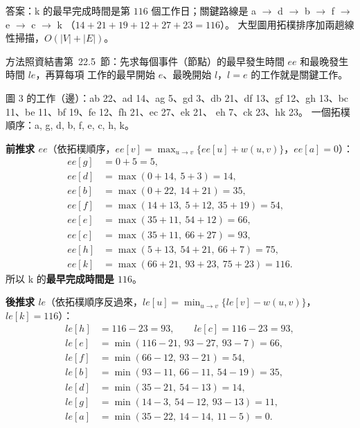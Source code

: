 \begin{pastsoln}
答案：k 的最早完成時間是第 $116$ 個工作日；關鍵路線是 a $\to$ d $\to$ b $\to$ f $\to$ e $\to$ c $\to$ k
（$14 + 21 + 19 + 12 + 27 + 23 = 116$）。 大型圖用拓樸排序加兩趟線性掃描，$O(|V| + |E|)$。

方法照資結書第~22.5~節：先求每個事件（節點）的最早發生時間 $\mathit{ee}$ 和最晚發生時間 $\mathit{le}$，再算每項
工作的最早開始 $e$、最晚開始 $l$，$l = e$ 的工作就是關鍵工作。

圖 3 的工作（邊）：ab 22、ad 14、ag 5、gd 3、db 21、df 13、gf 12、gh 13、bc 11、be 11、bf 19、fe 12、fh 21、ec 27、ek 21、
eh 7、ck 23、hk 23。 一個拓樸順序：a, g, d, b, f, e, c, h, k。

\textbf{前推求 $\mathit{ee}$}（依拓樸順序，$\mathit{ee}[v] = \max_{u \to v}\{\mathit{ee}[u] + w(u,v)\}$，$\mathit{ee}[a] = 0$）：
\begin{align*}
\mathit{ee}[g] &= 0 + 5 = 5, \\
\mathit{ee}[d] &= \max(0 + 14,\ 5 + 3) = 14, \\
\mathit{ee}[b] &= \max(0 + 22,\ 14 + 21) = 35, \\
\mathit{ee}[f] &= \max(14 + 13,\ 5 + 12,\ 35 + 19) = 54, \\
\mathit{ee}[e] &= \max(35 + 11,\ 54 + 12) = 66, \\
\mathit{ee}[c] &= \max(35 + 11,\ 66 + 27) = 93, \\
\mathit{ee}[h] &= \max(5 + 13,\ 54 + 21,\ 66 + 7) = 75, \\
\mathit{ee}[k] &= \max(66 + 21,\ 93 + 23,\ 75 + 23) = 116.
\end{align*}
所以 k 的\textbf{最早完成時間是 $116$}。

\textbf{後推求 $\mathit{le}$}（依拓樸順序反過來，$\mathit{le}[u] = \min_{u \to v}\{\mathit{le}[v] - w(u,v)\}$，
$\mathit{le}[k] = 116$）：
\begin{align*}
\mathit{le}[h] &= 116 - 23 = 93, \qquad \mathit{le}[c] = 116 - 23 = 93, \\
\mathit{le}[e] &= \min(116 - 21,\ 93 - 27,\ 93 - 7) = 66, \\
\mathit{le}[f] &= \min(66 - 12,\ 93 - 21) = 54, \\
\mathit{le}[b] &= \min(93 - 11,\ 66 - 11,\ 54 - 19) = 35, \\
\mathit{le}[d] &= \min(35 - 21,\ 54 - 13) = 14, \\
\mathit{le}[g] &= \min(14 - 3,\ 54 - 12,\ 93 - 13) = 11, \\
\mathit{le}[a] &= \min(35 - 22,\ 14 - 14,\ 11 - 5) = 0.
\end{align*}


\end{pastsoln}
